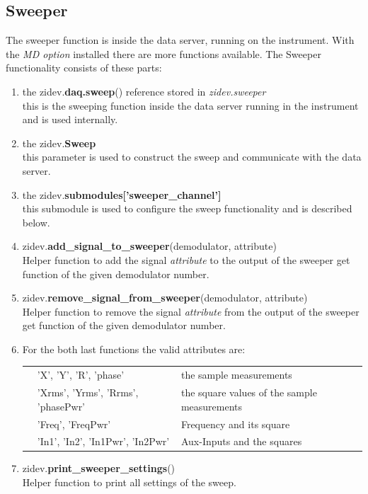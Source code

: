 \documentclass[11pt]{article} %
\begin{document}
\subsection{Sweeper}
The sweeper function is inside the data server, running on the instrument. With the {\it MD option} installed there are more functions available. The Sweeper functionality consists of these parts:
\begin{enumerate}
\item the zidev.{\bf daq.sweep}() reference stored in {\it zidev.sweeper} \\
	this is the sweeping function inside the data server running in the instrument and is used internally.
\item the zidev.{\bf Sweep} \\
	this parameter is used to construct the sweep and communicate with the data server.
\item the zidev.{\bf submodules['sweeper\_channel']} \\
	this submodule is used to configure the sweep functionality and is described below.

\item zidev.{\bf add\_signal\_to\_sweeper}(demodulator, attribute) \\
	Helper function to add the signal {\it attribute} to the output of the sweeper get function of the given demodulator number.
\item zidev.{\bf remove\_signal\_from\_sweeper}(demodulator, attribute) \\
	Helper function to remove the signal {\it attribute} from the output of the sweeper get function of the given demodulator number.
\item[] For the both last functions the valid attributes are: \\[-0.5em]
	\begin{longtable}{p{0.7cm}|p{6cm}|p{9cm}|}
	\cline{2-3}
	&'X', 'Y', 'R', 'phase' & the sample measurements \\ \cline{2-3}
	&'Xrms', 'Yrms', 'Rrms', 'phasePwr' & the square values of the sample measurements \\ \cline{2-3}
	&'Freq', 'FreqPwr' & Frequency and its square \\ \cline{2-3}
	&'In1', 'In2', 'In1Pwr', 'In2Pwr' & Aux-Inputs and the squares \\ \cline{2-3}
	\end{longtable}

\item zidev.{\bf print\_sweeper\_settings}() \\
	Helper function to print all settings of the sweep.

\end{enumerate}
\end{document}
